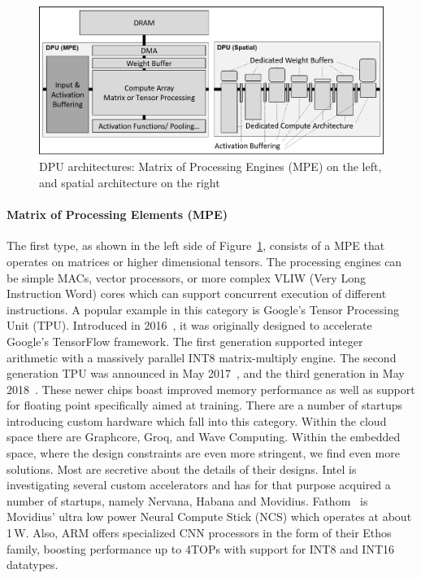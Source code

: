 \begin{figure}[h!]
\centering
\includegraphics[width=0.8\linewidth]{figures/dpu1.png}
\caption{DPU architectures: Matrix of Processing Engines (MPE) on the left, and spatial architecture on the right}
\label{fig:dpu}
\end{figure}

\paragraph*{Matrix of Processing Elements (MPE)} The first type, as shown in the left side of Figure~\ref{fig:dpu}, consists of a MPE that operates on matrices or higher dimensional tensors. The processing engines can be simple MACs, vector processors, or more complex VLIW (Very Long Instruction Word) cores which can support concurrent execution of different instructions.
A popular example in this category is Google's Tensor Processing Unit (TPU).  
Introduced in 2016~\cite{tpu1}, it was originally designed to accelerate Google's TensorFlow framework.
The first generation supported integer arithmetic with a massively parallel INT8 matrix-multiply engine.
The second generation TPU was announced in May 2017~\cite{tpu}, and the third generation in May 2018~\cite{tpu3}.
These newer chips boast improved memory performance as well as support for floating point specifically aimed at training.  
There are a number of startups introducing custom hardware which fall into this category.
Within the cloud space there are Graphcore, Groq, and Wave Computing.
Within the embedded space, where the design constraints are even more stringent, we find even more solutions. %
Most are secretive about the details of their designs. Intel is investigating several custom accelerators and has for that purpose acquired a number of startups, namely Nervana, Habana and Movidius. Fathom~\cite{movidius-tom} is Movidius' ultra low power Neural Compute Stick (NCS) which operates at about 1\,W.  
Also, ARM offers specialized CNN processors in the form of their Ethos family, boosting performance up to 4TOPs with support for INT8 and INT16 datatypes.

